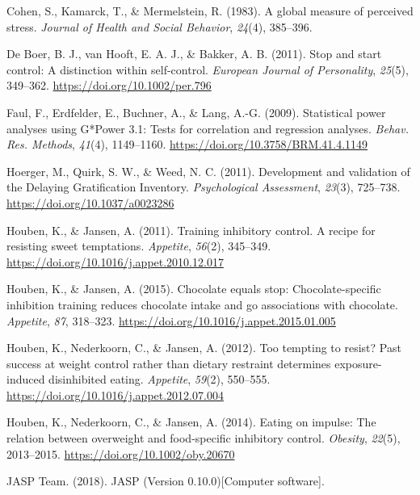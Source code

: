 \documentclass[man,floatsintext]{apa6}
\begin{document}
\leavevmode\hypertarget{ref-cohenGlobalMeasurePerceived1983}{}%
Cohen, S., Kamarck, T., \& Mermelstein, R. (1983). A global measure of perceived stress. \emph{Journal of Health and Social Behavior}, \emph{24}(4), 385--396.

\leavevmode\hypertarget{ref-deboerStopStartControl2011}{}%
De Boer, B. J., van Hooft, E. A. J., \& Bakker, A. B. (2011). Stop and start control: A distinction within self-control. \emph{European Journal of Personality}, \emph{25}(5), 349--362. \url{https://doi.org/10.1002/per.796}

\leavevmode\hypertarget{ref-faul_statistical_2009}{}%
Faul, F., Erdfelder, E., Buchner, A., \& Lang, A.-G. (2009). Statistical power analyses using G*Power 3.1: Tests for correlation and regression analyses. \emph{Behav. Res. Methods}, \emph{41}(4), 1149--1160. \url{https://doi.org/10.3758/BRM.41.4.1149}

\leavevmode\hypertarget{ref-hoergerDevelopmentValidationDelaying2011}{}%
Hoerger, M., Quirk, S. W., \& Weed, N. C. (2011). Development and validation of the Delaying Gratification Inventory. \emph{Psychological Assessment}, \emph{23}(3), 725--738. \url{https://doi.org/10.1037/a0023286}

\leavevmode\hypertarget{ref-houben_training_2011}{}%
Houben, K., \& Jansen, A. (2011). Training inhibitory control. A recipe for resisting sweet temptations. \emph{Appetite}, \emph{56}(2), 345--349. \url{https://doi.org/10.1016/j.appet.2010.12.017}

\leavevmode\hypertarget{ref-houben_chocolate_2015}{}%
Houben, K., \& Jansen, A. (2015). Chocolate equals stop: Chocolate-specific inhibition training reduces chocolate intake and go associations with chocolate. \emph{Appetite}, \emph{87}, 318--323. \url{https://doi.org/10.1016/j.appet.2015.01.005}

\leavevmode\hypertarget{ref-houben_too_2012}{}%
Houben, K., Nederkoorn, C., \& Jansen, A. (2012). Too tempting to resist? Past success at weight control rather than dietary restraint determines exposure-induced disinhibited eating. \emph{Appetite}, \emph{59}(2), 550--555. \url{https://doi.org/10.1016/j.appet.2012.07.004}

\leavevmode\hypertarget{ref-houben_eating_2014}{}%
Houben, K., Nederkoorn, C., \& Jansen, A. (2014). Eating on impulse: The relation between overweight and food-specific inhibitory control. \emph{Obesity}, \emph{22}(5), 2013--2015. \url{https://doi.org/10.1002/oby.20670}

\leavevmode\hypertarget{ref-JASP2018:1}{}%
JASP Team. (2018). JASP (Version 0.10.0){[}Computer software{]}.
\end{document}
